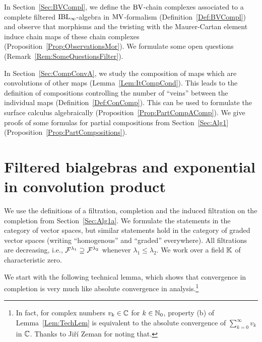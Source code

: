 \documentclass[\MainFolder/Text.tex]{subfiles}
\begin{document}
In Section~\ref{Sec:BVCompl}, we define the $\mathrm{BV}$-chain complexes associated to a complete filtered $\mathrm{IBL}_\infty$-algebra in $\mathrm{MV}$-formalism (Definition~\ref{Def:BVCompl}) and observe that morphisms and the twisting with the Maurer-Cartan element induce chain maps of these chain complexes (Proposition~\ref{Prop:ObservationsMor}). We formulate some open questions (Remark~\ref{Rem:SomeQuestionsFilter}).

In Section~\ref{Sec:CompConvA}, we study the composition of maps which are convolutions of other maps (Lemma~\ref{Lem:ItCompCond}). This leads to the definition of compositions controlling the number of ``veins'' between the individual maps (Definition~\ref{Def:ConComp}). This can be used to formulate the surface calculus algebraically (Proposition~\ref{Prop:PartCompAComp}). We give proofs of some formulas for partial compositions from Section~\ref{Sec:Alg1} (Proposition~\ref{Prop:PartCompositions}).


\section{Filtered bialgebras and exponential in convolution product}\label{Sec:DetailsOnFiltr}

We use the definitions of a filtration, completion and the induced filtration on the completion from Section~\ref{Sec:Alg1a}. We formulate the statements in the category of vector spaces, but similar statements hold in the category of graded vector spaces (writing ``homogenous'' and ``graded'' everywhere). All filtrations are decreasing, i.e., $\mathcal{F}^{\lambda_1} \supseteq \mathcal{F}^{\lambda_2}$ whenever $\lambda_1 \le \lambda_2$.
We work over a field $\mathbb{K}$ of characteristic zero.

We start with the following technical lemma, which shows that convergence in completion is very much like absolute convergence in analysis.\footnote{In fact, for complex numbers $v_k\in \mathbb{C}$ for $k\in\mathbb{N}_0$, property (b) of Lemma~\ref{Lem:TechLem} is equivalent to the absolute convergence of $\sum_{k=0}^\infty v_k$ in $\mathbb{C}$.
Thanks to Ji\v r\'i Zeman for noting that.}
 
\end{document}
